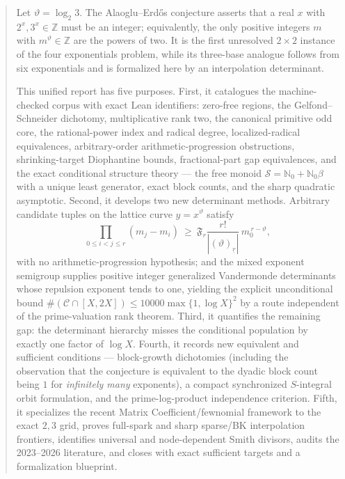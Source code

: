 \documentclass[11pt,oneside]{article}
\theoremstyle{definition}
\theoremstyle{remark}
\newcommand{\Nzero}{\mathbb N_0}
\newcommand{\Z}{\mathbb Z}
\newcommand{\thetaq}{\vartheta}
\newcommand{\Sol}{\mathcal S}
\newcommand{\Cand}{\mathcal C}
\newcommand{\fall}[2]{\left(#1\right)_{\!\underline{#2}}}
\newcommand{\SF}[1]{\mathfrak F_{#1}}
\begin{document}

\begin{abstract}
Let $\thetaq=\log_2 3$.  The Alaoglu--Erd\H{o}s conjecture asserts that a real $x$ with
$2^x,3^x\in\Z$ must be an integer; equivalently, the only positive integers $m$ with
$m^{\thetaq}\in\Z$ are the powers of two.  It is the first unresolved $2\times2$ instance of
the four exponentials problem, while its three-base analogue follows from six exponentials and
is formalized here by an interpolation determinant.

This unified report has five purposes.  First, it catalogues the machine-checked corpus with
exact Lean identifiers: zero-free regions, the Gelfond--Schneider dichotomy, multiplicative
rank two, the canonical primitive odd core, the rational-power index and radical degree,
localized-radical equivalences, arbitrary-order arithmetic-progression obstructions,
shrinking-target Diophantine bounds, fractional-part gap equivalences, and the exact
conditional structure theory --- the free monoid $\Sol=\Nzero+\Nzero\beta$ with a unique least
generator, exact block counts, and the sharp quadratic asymptotic.  Second, it develops two new
determinant methods.  Arbitrary candidate tuples on the lattice curve $y=x^{\thetaq}$ satisfy
\[
 \prod_{0\le i<j\le r}(m_j-m_i)\ \ge\ \SF{r}\frac{r!}{|\fall{\thetaq}{r}|}\,m_0^{\,r-\thetaq},
\]
with no arithmetic-progression hypothesis; and the mixed exponent semigroup supplies positive
integer generalized Vandermonde determinants whose repulsion exponent tends to one, yielding
the explicit unconditional bound $\#(\Cand\cap[X,2X])\le10000\max\{1,\log X\}^2$ by a route
independent of the prime-valuation rank theorem.  Third, it quantifies the remaining gap: the
determinant hierarchy misses the conditional population by exactly one factor of $\log X$.
Fourth, it records new equivalent and sufficient conditions --- block-growth dichotomies
(including the observation that the conjecture is equivalent to the dyadic block count being
$1$ for \emph{infinitely many} exponents), a compact synchronized $S$-integral orbit
formulation, and the prime-log-product independence criterion.  Fifth, it specializes the
recent Matrix Coefficient/fewnomial framework to the exact $2,3$ grid, proves full-spark and
sharp sparse/BK interpolation frontiers, identifies universal and node-dependent Smith
divisors, audits the 2023--2026 literature, and closes with exact sufficient targets and a
formalization blueprint.
\end{abstract}
\end{document}
